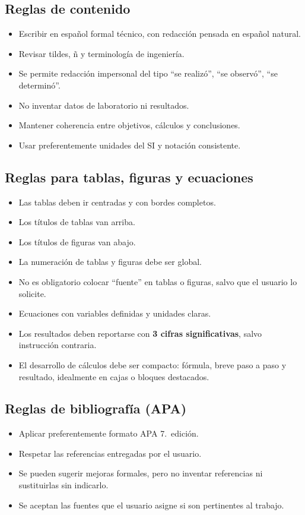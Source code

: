 \documentclass[12pt,a4paper]{article}
\begin{document}
\subsection{Reglas de contenido}
\begin{itemize}
  \item Escribir en espa\~nol formal t\'ecnico, con redacci\'on pensada en espa\~nol natural.
  \item Revisar tildes, \~n y terminolog\'ia de ingenier\'ia.
  \item Se permite redacci\'on impersonal del tipo ``se realiz\'o'', ``se observ\'o'', ``se determin\'o''.
  \item No inventar datos de laboratorio ni resultados.
  \item Mantener coherencia entre objetivos, c\'alculos y conclusiones.
  \item Usar preferentemente unidades del SI y notaci\'on consistente.
\end{itemize}

\subsection{Reglas para tablas, figuras y ecuaciones}
\begin{itemize}
  \item Las tablas deben ir centradas y con bordes completos.
  \item Los t\'itulos de tablas van arriba.
  \item Los t\'itulos de figuras van abajo.
  \item La numeraci\'on de tablas y figuras debe ser global.
  \item No es obligatorio colocar ``fuente'' en tablas o figuras, salvo que el usuario lo solicite.
  \item Ecuaciones con variables definidas y unidades claras.
  \item Los resultados deben reportarse con \textbf{3 cifras significativas}, salvo instrucci\'on contraria.
  \item El desarrollo de c\'alculos debe ser compacto: f\'ormula, breve paso a paso y resultado, idealmente en cajas o bloques destacados.
\end{itemize}

\subsection{Reglas de bibliograf\'ia (APA)}
\begin{itemize}
  \item Aplicar preferentemente formato APA 7.\textordfeminine~edici\'on.
  \item Respetar las referencias entregadas por el usuario.
  \item Se pueden sugerir mejoras formales, pero no inventar referencias ni sustituirlas sin indicarlo.
  \item Se aceptan las fuentes que el usuario asigne si son pertinentes al trabajo.
\end{itemize}
\end{document}
